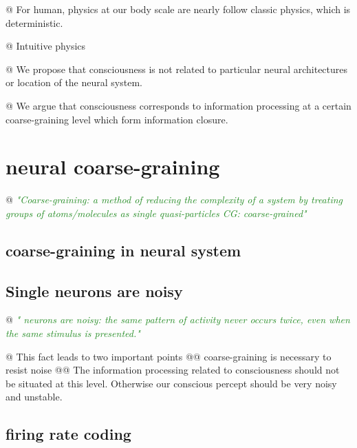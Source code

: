 \documentclass[utf8]{article}
\newenvironment{ants}
			{
			 \begin{easylist}[itemize]
			}
			{
			\end{easylist}
			}
\newcommand{\rewrite}[1]{\textcolor{ForestGreen}{\textit{"#1"}}\newline}
\newcommand{\needref}[1]{%
			\ifthenelse{\equal{#1}{}}{%
				\todo[color=White, linecolor=BlueViolet]{\textcolor{BlueViolet}{Ref}}}{%
				\todo[color=White, linecolor=BlueViolet]{\textcolor{BlueViolet}{Ref: #1}}%
				}%
		}
\begin{document}
		\begin{ants}
			@ For human, physics at our body scale are nearly follow classic physics, which is deterministic. 
			
			
			@ Intuitive physics \needref{Intuitive physics}
			
			
			@ We propose that consciousness is not related to particular neural architectures or location of the neural system.
			
			@ We argue that consciousness corresponds to information processing at a certain coarse-graining level which form information closure. 
		\end{ants}
	

	\section{neural coarse-graining}
	
		\begin{ants}
			@ \rewrite{Coarse-graining: a method of reducing the complexity of a system by treating groups of atoms/molecules as single quasi-particles CG: coarse-grained}
			
		\end{ants}
	
		\subsection{coarse-graining in neural system}
		\subsection{Single neurons are noisy}
		
			\begin{ants}
				@ \rewrite{
					neurons are noisy: the same pattern of activity never occurs twice, even when the same stimulus is presented.}
				
				@ This fact leads to two important points
					@@ coarse-graining is necessary to resist noise
					@@ The information processing related to consciousness should not be situated at this level. Otherwise our conscious percept should be very noisy and unstable.
								
			\end{ants}

		
		
		\subsection{firing rate coding}
		
\end{document}

